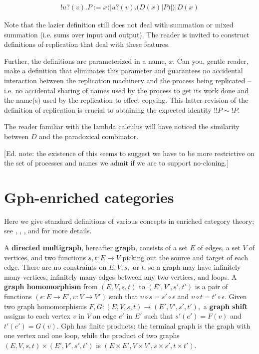 \documentclass{llncs}
\newcommand{\maps}{\colon}
\newcommand{\lliftb}{\langle\!|}
\newcommand{\rliftb}{|\!\rangle}
\newcommand{\binpar}[2]{#1 | #2}
\newcommand{\prefix}[3]{#1?(#2) . #3}
\newcommand{\lift}[2]{#1 \lliftb #2 \rliftb}
\newcommand{\bangp}[1]{! #1}
\begin{document}
\begin{eqnarray}
\bangp{\prefix{u}{v}{P}} 
	:= 
	\binpar{\lift{x}{\prefix{u}{v}{(\binpar{D(x)}{P})}}}{D(x)} \nonumber
\end{eqnarray}

\begin{remark}
  Note that the lazier definition still does not deal with summation
  or mixed summation (i.e. sums over input and output). The reader is
  invited to construct definitions of replication that deal with these
  features. 

  Further, the definitions are parameterized in a name, $x$. Can you,
  gentle reader, make a definition that eliminates this parameter and
  guarantees no accidental interaction between the replication
  machinery and the process being replicated -- i.e. no accidental
  sharing of names used by the process to get its work done and the
  name(s) used by the replication to effect copying. This latter
  revision of the definition of replication is crucial to obtaining
  the expected identity $!!P \sim !P$.
\end{remark}

\begin{remark}\label{rem:paradoxical_combinator}
  The reader familiar with the lambda calculus will have noticed the
  similarity between $D$ and the paradoxical combinator.

  [Ed. note: the existence of this seems to suggest we have to be more
  restrictive on the set of processes and names we admit if we are to
  support no-cloning.]
\end{remark}

\section{Gph-enriched categories}
Here we give standard definitions of various concepts in enriched category theory; see \cite{CIS-335497}, \cite{Power99EnrichedLawvereTheories}, \cite{DBLP:journals/acs/LackR11}, and \cite{Trimble} for more details.

A {\bf directed multigraph}, hereafter {\bf graph}, consists of a set $E$ of edges, a set $V$ of vertices, and two functions $s,t\maps E \to V$ picking out the source and target of each edge.  There are no constraints on $E, V, s,$ or $t$, so a graph may have infinitely many vertices, infinitely many edges between any two vertices, and loops.  A {\bf graph homomorphism} from $(E, V, s, t)$ to $(E', V', s', t')$ is a pair of functions $(\epsilon\maps E \to E', \upsilon\maps V \to V')$ such that $\upsilon\circ s = s' \circ \epsilon$ and $\upsilon\circ t = t' \circ \epsilon$.  Given two graph homomorphisms $F, G\maps (E, V, s, t) \to (E', V', s', t'),$ a {\bf graph shift} assigns to each vertex $v$ in $V$ an edge $e'$ in $E'$ such that $s'(e') = F(v)$ and $t'(e') = G(v).$  Gph has finite products: the terminal graph is the graph with one vertex and one loop, while the product of two graphs $(E, V, s, t) \times (E', V', s', t')$ is $(E \times E', V \times V', s \times s', t\times t').$
\end{document}
